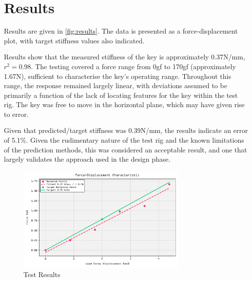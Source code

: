 \documentclass[10pt]{article}
\begin{document}
\section{Results}

Results are given in \autoref{fig:results}. The data is presented as a force-displacement plot,
with target stiffness values also indicated.

Results show that the measured stiffness of the key is approximately 0.37N/mm, $r^2=0.98$. The
testing covered a force range from 0gf to 170gf (approximately 1.67N), sufficient to characterise
the key's operating range. Throughout this range, the response remained largely linear, with
deviations assumed to be primarily a function of the lack of locating features for the key within
the test rig. The key was free to move in the horizontal plane, which may have given rise to error.

Given that predicted/target stiffness was 0.39N/mm, the results indicate an error of 5.1\%. Given
the rudimentary nature of the test rig and the known limitations of the prediction methods, this
was considered an acceptable result, and one that largely validates the approach used in the design
phase.

\begin{figure}[H]
	\centering
	\includegraphics[width=0.75\textwidth]{./assets/09-test-results.png}
	\caption{Test Results}
	\label{fig:results}
\end{figure}

\end{document}
